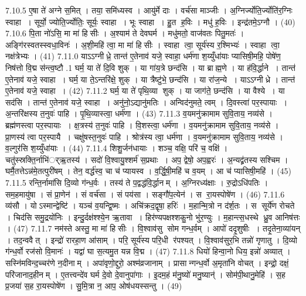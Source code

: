 7.10.5
ए॒षा ते॑ अग्ने स॒मित् । तया॒ समि॑ध्यस्व । आयु॑र्मे दाः । वर्च॑सा माञ्जीः । अ॒ग्निर्ज्योति॒र्ज्योति॑र॒ग्निः स्वाहा । सूर्यो॒ ज्योति॒र्ज्योतिः॒ सूर्यः॒ स्वाहा । भूः स्वाहा । हु॒त ह॒विः । मधु॑ ह॒विः । इन्द्र॑तमे॒ऽग्नौ । (40)
7.10.6
पि॒ता नो॑ऽसि॒ मा मा॑ हिसीः । अ॒श्याम॑ ते देवघर्म । मधु॑मतो॒ वाज॑वतः पितु॒मतः॑ । अङ्गि॑रस्वतस्स्वधा॒विनः॑ । अ॒शी॒महि॑ त्वा॒ मा मा॑ हिसीः । स्वाहा त्वा॒ सूर्य॑स्य र॒श्मिभ्यः॑ । स्वाहा त्वा॒ नक्ष॑त्रेभ्यः । (41)
7.11.0
याऽऽग्नीध्रे॒ तान्त॑ ए॒तेनाव॑ यजे॒ स्वाहा॒ धर्म॑णा श॒य्युँधा॑याः प्यासिषी॒महि॒ पोषे॑ण॒ निष॑त्तो वि॒द्म स॑न्त्व॒ष्टौ
.1
घर्म॒ या ते॑ दि॒वि शुक् । या गा॑य॒त्रे छन्द॑सि । या ब्राह्म॒णे । या ह॑वि॒र्द्धाने । तान्त॑ ए॒तेनाव॑ यजे॒ स्वाहा । घर्म॒ या ते॒ऽन्तरि॑क्षे॒ शुक् । या त्रैष्टु॑भे॒ छन्द॑सि । या रा॑ज॒न्ये । याऽऽग्नीध्रे । तान्त॑ ए॒तेनाव॑ यजे॒ स्वाहा । (42)
7.11.2
घर्म॒ या ते॑ पृथि॒व्या शुक् । या जाग॑ते॒ छन्द॑सि । या वैश्ये । या सद॑सि । तान्त॑ ए॒तेनाव॑ यजे॒ स्वाहा । अनु॑नो॒ऽद्यानु॑मतिः । अन्विद॑नुमते॒ त्वम् । दि॒वस्त्वा॑ पर॒स्पायाः । अ॒न्तरि॑क्षस्य त॒नुवः॑ पाहि । पृ॒थि॒व्यास्त्वा॒ धर्म॑णा । (43)
7.11.3
व॒यमनु॑क्रामाम सुवि॒ताय॒ नव्य॑से । ब्रह्म॑णस्त्वा पर॒स्पायाः । क्ष॒त्रस्य॑ त॒नुवः॑ पाहि । वि॒शस्त्वा॒ धर्म॑णा । व॒यमनु॑क्रामाम सुवि॒ताय॒ नव्य॑से । प्रा॒णस्य॑ त्वा पर॒स्पायै । चक्षु॑षस्त॒नुवः॑ पाहि । श्रोत्र॑स्य त्वा॒ धर्म॑णा । व॒यमनु॑क्रामाम सुवि॒ताय॒ नव्य॑से । व॒ल्गुर॑सि श॒य्युँधा॑याः । (44)
7.11.4
शिशु॒र्जन॑धायाः । शञ्च॒ वक्षि॒ परि॑ च॒ वक्षि॑ । चतु॑स्स्रक्ति॒र्नाभि॑र््ऋ॒तस्य॑ । सदो॑ वि॒श्वायु॒श्शर्म॑ स॒प्रथाः । अप॒ द्वेषो॒ अप॒ह्वरः॑ । अ॒न्यद्व्र॑तस्य सश्चिम । घर्मै॒तत्तेऽन्न॑मे॒तत्पुरी॑षम् । तेन॒ वर्द्ध॑स्व॒ चा च॑ प्यायस्व । व॒र्द्धि॒षी॒महि॑ च व॒यम् । आ च॑ प्यासिषी॒महि॑ । (45)
7.11.5
रन्ति॒र्नामा॑सि दि॒व्यो ग॑न्ध॒र्वः । तस्य॑ ते प॒द्वद्ध॑वि॒र्द्धानम् । अ॒ग्निरध्य॑क्षाः । रु॒द्रोऽधि॑पतिः । सम॒हमायु॑षा । सं प्रा॒णेन॑ । सं वर्च॑सा । सं पय॑सा । सङ्गौ॑प॒त्येन॑ । स रा॒यस्पोषे॑ण । (46)
7.11.6
व्य॑सौ । योऽस्मान्द्वेष्टि॑ । यञ्च॑ व॒यन्द्वि॒ष्मः । अचि॑क्रद॒द्वृषा॒ हरिः॑ । म॒हान्मि॒त्रो न द॑र्\mbox{}श॒तः । स सूर्ये॑ण रोचते । चिद॑सि समु॒द्रयो॑निः । इन्दु॒र्दक्ष॑श्श्ये॒न ऋ॒तावा । हिर॑ण्यपक्षश्शकु॒नो भु॑र॒ण्युः । म॒हान्त्स॒धस्थे ध्रु॒व आनिष॑त्तः । (47)
7.11.7
नम॑स्ते अस्तु॒ मा मा॑ हिसीः । वि॒श्वाव॑सु सोम गन्ध॒र्वम् । आपो॑ ददृ॒शुषीः । तदृ॒तेना॒व्या॑यन् । तद॒न्ववैत् । इन्द्रो॑ रारहा॒ण आ॑साम् । परि॒ सूर्य॑स्य परि॒धी र॑पश्यत् । वि॒श्वाव॑सुर॒भि तन्नो॑ गृणातु । दि॒व्यो ग॑न्ध॒र्वो रज॑सो वि॒मानः॑ । यद्वा॑ घा स॒त्यमु॒त यन्न वि॒द्म । (47)
7.11.8
धियो॑ हिन्वा॒नो धिय॒ इन्नो॑ अव्यात् । सस्नि॑मविन्द॒च्चर॑णे न॒दीनाम् । अपा॑वृणो॒द्दुरो॒ अश्म॑व्रजानाम् । प्रासान्गन्ध॒र्वो अ॒मृता॑नि वोचत् । इन्द्रो॒ दक्षं॒ परि॑जानाद॒हीनम् । ए॒तत्त्वन्दे॑व घर्म दे॒वो दे॒वानुपा॑गाः । इ॒दम॒हं म॑नु॒ष्यो॑ मनु॒ष्यान्॑ । सोम॑पी॒थानु॒मेहि॑ । स॒ह प्र॒जया॑ स॒ह रा॒यस्पोषे॑ण । सु॒मि॒त्रा न॒ आप॒ ओष॑धयस्सन्तु । (49)
